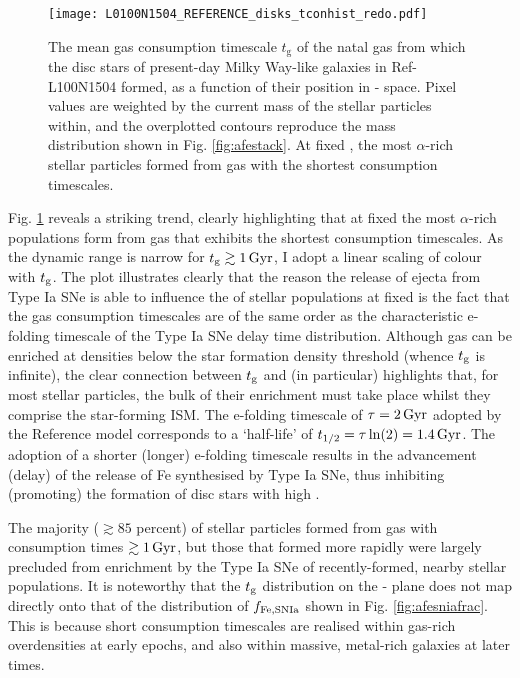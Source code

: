\begin{figure}
\texttt{[image: L0100N1504\_REFERENCE\_disks\_tconhist\_redo.pdf]}
\caption[Mean gas consumption timescale as a fucntion of \afe{} and \feh{} for disk stars in Ref-L100N1504]{\label{fig:afetcon} The mean gas consumption timescale $t_{\mathrm{g}}$ of the natal gas from which the disc stars of present-day Milky Way-like galaxies in Ref-L100N1504 formed, as a function of their position in \afe{}-\feh{} space.  Pixel values are weighted by the current mass of the stellar particles within, and the overplotted contours reproduce the mass distribution shown in Fig. \ref{fig:afestack}. At fixed \feh{}, the most $\alpha$-rich stellar particles formed from gas with the shortest consumption timescales.}
\end{figure}

Fig. \ref{fig:afetcon} reveals a striking trend, clearly highlighting that at fixed \feh{} the most $\alpha$-rich populations form from gas that exhibits the shortest consumption timescales. As the dynamic range is narrow for $t_{\rm g} \gtrsim 1\,{\rm Gyr}$, I adopt a linear scaling of colour with $t_{\rm g}$. The plot illustrates clearly that the reason the release of ejecta from Type Ia SNe is able to influence the \afe{} of stellar populations at fixed \feh{} is the fact that the gas consumption timescales are of the same order as the characteristic e-folding timescale of the Type Ia SNe delay time distribution. Although gas can be enriched at densities below the star formation density threshold (whence $t_{\rm g}$ is infinite), the clear connection between $t_{\rm g}$ and (in particular) \afe{} highlights that, for most stellar particles, the bulk of their enrichment must take place whilst they comprise the star-forming ISM. The e-folding timescale of $\tau=2\,{\rm Gyr}$ adopted by the Reference model corresponds to a `half-life' of $t_{1/2}=\tau\ln(2)=1.4\,{\rm Gyr}$. The adoption of a shorter (longer) e-folding timescale results in the advancement (delay) of the release of Fe synthesised by Type Ia SNe, thus inhibiting (promoting) the formation of disc stars with high \afe{}. 

The majority ($\gtrsim 85$ percent) of stellar particles formed from gas with consumption times $\gtrsim 1\,{\rm Gyr}$, but those that formed more rapidly were largely precluded from enrichment by the Type Ia SNe of recently-formed, nearby stellar populations. It is noteworthy that the $t_{\rm g}$ distribution on the \afe{}-\feh{} plane does not map directly onto that of the distribution of $f_{\rm Fe,SNIa}$ shown in Fig. \ref{fig:afesniafrac}. This is because short consumption timescales are realised within gas-rich overdensities at early epochs, and also within massive, metal-rich galaxies at later times.

